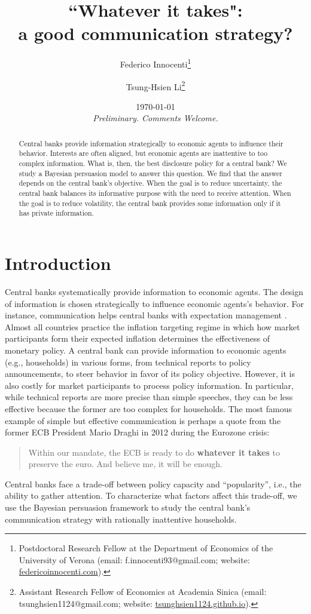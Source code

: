 \documentclass[12pt,a4paper]{article}
\title{``Whatever it takes": \\ a good communication strategy?}
\author{Federico Innocenti\thanks{Postdoctoral Research Fellow at the Department of Economics of the University of Verona (email: f.innocenti93@gmail.com; website: \href{https://federicoinnocenti.com/}{federicoinnocenti.com}).} \and Tsung-Hsien Li\thanks{Assistant Research Fellow of Economics at Academia Sinica (email: tsunghsien1124@gmail.com; website: \href{https://tsunghsien1124.github.io/}{tsunghsien1124.github.io}).}}
\date{\today \\ \medskip
\emph{Preliminary. Comments Welcome.}}
\begin{document}
\setlength{\parskip}{2mm}

\maketitle

\begin{abstract}
Central banks provide information strategically to economic agents to influence their behavior. Interests are often aligned, but economic agents are inattentive to too complex information. What is, then, the best disclosure policy for a central bank? We study a Bayesian persuasion model to answer this question. We find that the answer depends on the central bank's objective. When the goal is to reduce uncertainty, the central bank balances its informative purpose with the need to receive attention. When the goal is to reduce volatility, the central bank provides some information only if it has private information. 
\end{abstract}

\newpage

\section{Introduction}

Central banks systematically provide information to economic agents. The design of information is chosen strategically to influence economic agents's behavior. For instance, communication helps central banks with expectation management \citep{Casiraghi2022}. Almost all countries practice the inflation targeting regime in which how market participants form their expected inflation determines the effectiveness of monetary policy. A central bank can provide information to economic agents (e.g., households) in various forms, from technical reports to policy announcements, to steer behavior in favor of its policy objective. However, it is also costly for market participants to process policy information. In particular, while technical reports are more precise than simple speeches, they can be less effective because the former are too complex for households.
The most famous example of simple but effective communication is perhaps a quote from the former ECB President Mario Draghi in 2012 during the Eurozone crisis:
\begin{quote}
Within our mandate, the ECB is ready to do \textbf{whatever it takes} to preserve the euro. And believe me, it will be enough.
\end{quote}
Central banks face a trade-off between policy capacity and ``popularity'', i.e., the ability to gather attention. To characterize what factors affect this trade-off, we use the Bayesian persuasion framework to study the central bank's communication strategy with rationally inattentive households.
\end{document}
